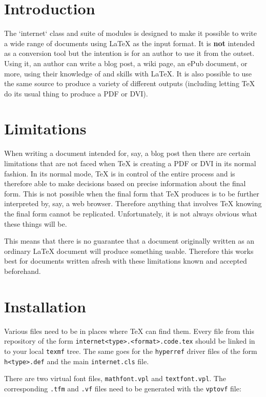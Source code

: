 \documentclass[github,text]{internet}
\begin{document}
\section{Introduction}

The `internet` class and suite of modules is designed to make it possible to write a wide range of documents using \LaTeX{} as the input format.
It is \textbf{not} intended as a conversion tool but the intention is for an author to use it from the outset.
Using it, an author can write a blog post, a wiki page, an ePub document, or more, using their knowledge of and skills with \LaTeX{}.
It is also possible to use the same source to produce a variety of different outputs (including letting \TeX{} do its usual thing to produce a PDF or DVI).

\section{Limitations}

When writing a document intended for, say, a blog post then there are certain limitations that are not faced when \TeX{} is creating a PDF or DVI in its normal fashion.
In its normal mode, \TeX{} is in control of the entire process and is therefore able to make decisions based on precise information about the final form.
This is not possible when the final form that \TeX{} produces is to be further interpreted by, say, a web browser.
Therefore anything that involves \TeX{} knowing the final form cannot be replicated.
Unfortunately, it is not always obvious what these things will be.

This means that there is no guarantee that a document originally written as an ordinary \LaTeX{} document will produce something usable.
Therefore this works best for documents written afresh with these limitations known and accepted beforehand.

\section{Installation}

Various files need to be in places where \TeX{} can find them.
Every file from this repository of the form \verb+internet<type>.<format>.code.tex+ should be linked in to your local \verb+texmf+ tree.
The same goes for the \verb+hyperref+ driver files of the form \verb+h<type>.def+ and the main \verb+internet.cls+ file.

There are two virtual font files, \verb+mathfont.vpl+ and \verb+textfont.vpl+.
The corresponding \verb+.tfm+ and \verb+.vf+ files need to be generated with the \verb+vptovf+ file:
\end{document}
